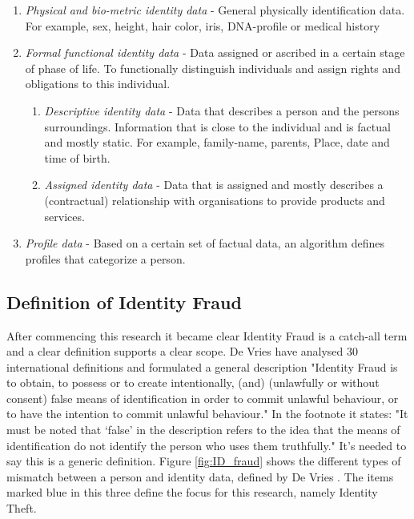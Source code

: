 \begin{enumerate}
\item \textit{Physical and bio-metric identity data} - General physically identification data. For example, sex, height, hair color, iris, DNA-profile or medical history
\item \textit{Formal functional identity data} - Data assigned or ascribed in a certain stage of phase of life. To functionally distinguish individuals and assign rights and obligations to this individual.
\begin{enumerate}
\item \textit{Descriptive identity data} - Data that describes a person and the persons surroundings. Information that is close to the individual and is factual and mostly static. For example, family-name, parents, Place, date and time of birth. 
\item \textit{Assigned identity data} - Data that is assigned and mostly describes a (contractual) relationship with organisations to provide products and services.
\end{enumerate}
\item \textit{Profile data} - Based on a certain set of factual data, an algorithm defines profiles that categorize a person. 
\end{enumerate}

\subsection{Definition of Identity Fraud}\label{Def_ID_Fraud}
After commencing this research it became clear Identity Fraud is a catch-all term and a clear definition supports a clear scope. De Vries \etal \cite{97408536fd1c4f4e9d1615b7a4a4473e} have analysed 30 international definitions and formulated a general description "Identity Fraud is to obtain, to possess or to create intentionally, (and) (unlawfully or without consent) false means of identification in order to commit unlawful behaviour, or to have the intention to commit unlawful behaviour." In the footnote it states: "It must be noted that ‘false’ in the description refers to the idea that the means of identification do not identify the person who uses them truthfully." It's needed to say this is a generic definition. Figure \ref{fig:ID_fraud} shows the different types of mismatch between a person and identity data, defined by De Vries \etal \cite{Vries2007IdentiteitsfraudeEA}. The items marked blue in this three define the focus for this research, namely Identity Theft.

